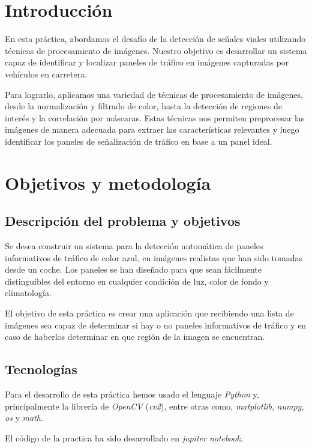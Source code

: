 \documentclass[a4paper, 12pt]{article}
\begin{document}
\section{Introducción}
En esta práctica, abordamos el desafío de la detección de señales viales utilizando técnicas de procesamiento de imágenes. Nuestro objetivo es desarrollar un sistema capaz de identificar y localizar paneles de tráfico en imágenes capturadas por vehículos en carretera.

Para lograrlo, aplicamos una variedad de técnicas de procesamiento de imágenes, desde la normalización y filtrado de color, hasta la detección de regiones de interés y la correlación por máscaras. Estas técnicas nos permiten preprocesar las imágenes de manera adecuada para extraer las características relevantes y luego identificar los paneles de señalización de tráfico en base a un panel ideal.


\section{Objetivos y metodología}

\subsection{Descripción del problema y objetivos}
Se desea construir un sistema para la detección automática de paneles informativos de tráfico de color azul, en imágenes realistas que han sido tomadas desde un coche. Los paneles se han diseñado para que sean fácilmente distinguibles del entorno en cualquier condición de luz, color de fondo y climatología.

El objetivo de esta práctica es crear una aplicación que recibiendo una lista de imágenes sea capaz de determinar si hay o no paneles informativos de tráfico y en caso de haberlos determinar en que región de la imagen se encuentran. 

\subsection{Tecnologías}
Para el desarrollo de esta práctica hemos usado el lenguaje \textit{Python} y, principalmente la librería de \textit{OpenCV} (\textit{cv2}), entre otras como, \textit{matplotlib}, \textit{numpy}, \textit{os} y \textit{math}. 

El código de la practica ha sido desarrollado en \textit{jupiter notebook}.
\end{document}
